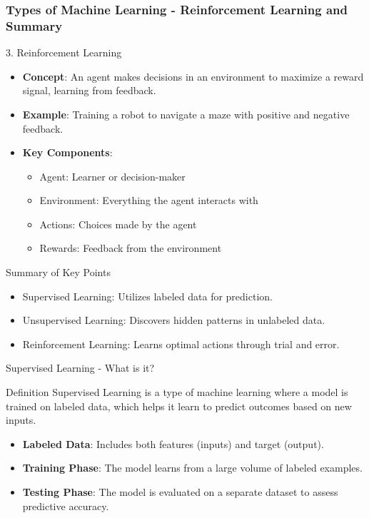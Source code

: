 \documentclass[aspectratio=169]{beamer}
\begin{document}
\begin{frame}[fragile]
    \frametitle{Types of Machine Learning - Reinforcement Learning and Summary}
    \begin{block}{3. Reinforcement Learning}
        \begin{itemize}
            \item \textbf{Concept}: An agent makes decisions in an environment to maximize a reward signal, learning from feedback.
            \item \textbf{Example}: Training a robot to navigate a maze with positive and negative feedback.
            \item \textbf{Key Components}:
            \begin{itemize}
                \item Agent: Learner or decision-maker
                \item Environment: Everything the agent interacts with
                \item Actions: Choices made by the agent
                \item Rewards: Feedback from the environment
            \end{itemize}
        \end{itemize}
    \end{block}

    \begin{block}{Summary of Key Points}
        \begin{itemize}
            \item Supervised Learning: Utilizes labeled data for prediction.
            \item Unsupervised Learning: Discovers hidden patterns in unlabeled data.
            \item Reinforcement Learning: Learns optimal actions through trial and error.
        \end{itemize}
    \end{block}
\end{frame}

\begin{frame}[fragile]{Supervised Learning - What is it?}
  \begin{block}{Definition}
    Supervised Learning is a type of machine learning where a model is trained on labeled data, which helps it learn to predict outcomes based on new inputs.
  \end{block}
  \begin{itemize}
    \item \textbf{Labeled Data}: Includes both features (inputs) and target (output).
    \item \textbf{Training Phase}: The model learns from a large volume of labeled examples.
    \item \textbf{Testing Phase}: The model is evaluated on a separate dataset to assess predictive accuracy.
  \end{itemize}
\end{frame}
\end{document}
